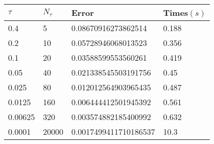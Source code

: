 \begin{tabular}{llll} 
\hline 
$\tau$  & $N_\tau$  &  Error & Times$(s)$  \\ 
\hline \hline 
0.4  & 5 & \num{0.08670916273862514} & 0.188 \\ 
0.2  & 10 & \num{0.05728946068013523} & 0.356 \\ 
0.1  & 20 & \num{0.03588599553560261} & 0.419 \\ 
0.05  & 40 & \num{0.021338545503191756} & 0.45 \\ 
0.025  & 80 & \num{0.012012564903965435} & 0.487 \\ 
0.0125  & 160 & \num{0.006444412501945392} & 0.561 \\ 
0.00625  & 320 & \num{0.003574882185400992} & 0.632 \\ 
0.0001  & 20000 & \num{0.0017499411710186537} & 10.3 \\ 
\hline 
\end{tabular} 
